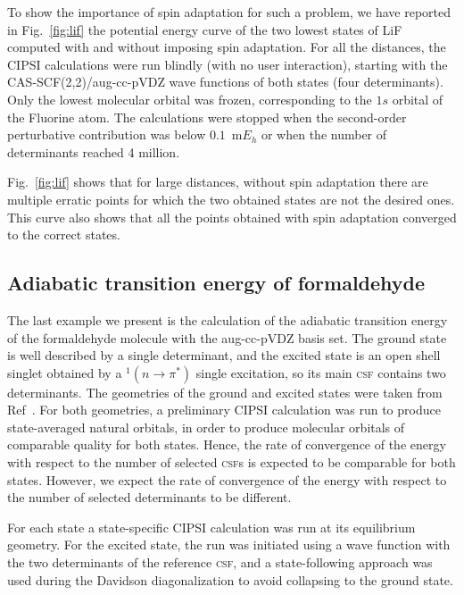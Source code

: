 \documentclass[aip,jcp,reprint,showkeys]{revtex4-1}
\newcommand{\csf}{\textsc{csf}}
\begin{document}
To show the importance of spin adaptation for such a problem, we have reported
in Fig.~\ref{fig:lif} the potential energy curve of the two lowest states of
LiF computed with and without imposing spin adaptation. For all the distances,
the CIPSI calculations were run blindly (with no user interaction), starting
with the CAS-SCF(2,2)/aug-cc-pVDZ  wave functions of both states (four
determinants). Only the lowest molecular orbital was frozen, corresponding to
the $1s$ orbital of the Fluorine atom. The calculations were stopped when the
second-order perturbative contribution was below $0.1$~m$E_h$ or when the
number of determinants reached 4 million.

Fig.~\ref{fig:lif} shows that for large distances, without spin adaptation
there are multiple erratic points for which the two obtained states are not
the desired ones. This curve also shows that all the points obtained with spin
adaptation converged to the correct states.

\subsection{Adiabatic transition energy of formaldehyde}

The last example we present is the calculation of the adiabatic transition
energy of the formaldehyde molecule with the aug-cc-pVDZ basis set.  The ground
state is well described by a single determinant, and the excited state is an
open shell singlet obtained by a $^1(n \rightarrow \pi^*)$ single excitation,
so its main {\csf} contains two determinants.  The geometries of the ground and
excited states were taken from Ref~\citep{Loos_2018}. For both geometries, a
preliminary CIPSI calculation was run to produce state-averaged natural
orbitals, in order to produce molecular orbitals of comparable quality for
both states. Hence, the rate of convergence of the energy with respect to the
number of selected \csf s is expected to be comparable for both states.
However, we expect the rate of convergence of the energy with respect to the
number of selected determinants to be different. 

For each state a state-specific CIPSI calculation was run at its equilibrium
geometry.
For the excited state, the run was initiated using a wave function with
the two determinants of the reference \csf , and a state-following approach was
used during the Davidson diagonalization to avoid collapsing to the ground state.
\end{document}
